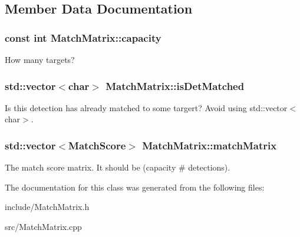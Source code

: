 \subsection{Member Data Documentation}
\hypertarget{classMatchMatrix_aea0cf328c2400c73e0146d9e68e310d9}{}
\subsubsection[{capacity}]{\setlength{\rightskip}{0pt plus 5cm}const int Match\+Matrix\+::capacity}\label{classMatchMatrix_aea0cf328c2400c73e0146d9e68e310d9}
How many targets? \hypertarget{classMatchMatrix_ae0739695c34fa591511ed653bc2f5173}{}
\subsubsection[{is\+Det\+Matched}]{\setlength{\rightskip}{0pt plus 5cm}std\+::vector$<$char$>$ Match\+Matrix\+::is\+Det\+Matched}\label{classMatchMatrix_ae0739695c34fa591511ed653bc2f5173}
Is this detection has already matched to some targert? Avoid using std\+::vector$<$char$>$. \hypertarget{classMatchMatrix_a79a0696b5718167910fdc83cb63da755}{}
\subsubsection[{match\+Matrix}]{\setlength{\rightskip}{0pt plus 5cm}std\+::vector$<${\bf Match\+Score}$>$ Match\+Matrix\+::match\+Matrix}\label{classMatchMatrix_a79a0696b5718167910fdc83cb63da755}
The match score matrix. It should be (capacity  \# detections). 

The documentation for this class was generated from the following files\+:\begin{DoxyCompactItemize}
\item 
include/Match\+Matrix.\+h\item 
src/Match\+Matrix.\+cpp\end{DoxyCompactItemize}
